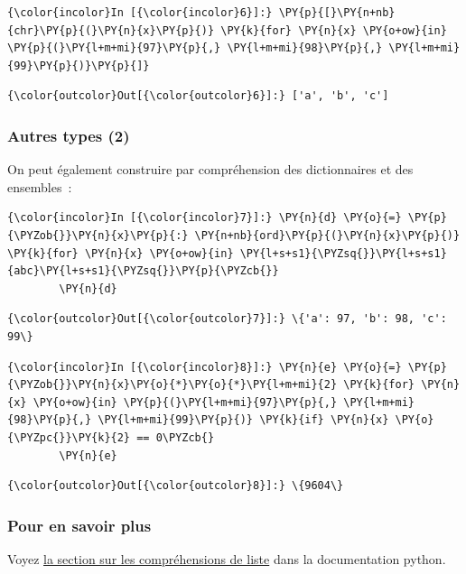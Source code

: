     \begin{Verbatim}[commandchars=\\\{\}]
{\color{incolor}In [{\color{incolor}6}]:} \PY{p}{[}\PY{n+nb}{chr}\PY{p}{(}\PY{n}{x}\PY{p}{)} \PY{k}{for} \PY{n}{x} \PY{o+ow}{in} \PY{p}{(}\PY{l+m+mi}{97}\PY{p}{,} \PY{l+m+mi}{98}\PY{p}{,} \PY{l+m+mi}{99}\PY{p}{)}\PY{p}{]}
\end{Verbatim}


\begin{Verbatim}[commandchars=\\\{\}]
{\color{outcolor}Out[{\color{outcolor}6}]:} ['a', 'b', 'c']
\end{Verbatim}
            
    \hypertarget{autres-types-2}{%
\subsubsection{Autres types (2)}\label{autres-types-2}}

    On peut également construire par compréhension des dictionnaires et des
ensembles~:

    \begin{Verbatim}[commandchars=\\\{\}]
{\color{incolor}In [{\color{incolor}7}]:} \PY{n}{d} \PY{o}{=} \PY{p}{\PYZob{}}\PY{n}{x}\PY{p}{:} \PY{n+nb}{ord}\PY{p}{(}\PY{n}{x}\PY{p}{)} \PY{k}{for} \PY{n}{x} \PY{o+ow}{in} \PY{l+s+s1}{\PYZsq{}}\PY{l+s+s1}{abc}\PY{l+s+s1}{\PYZsq{}}\PY{p}{\PYZcb{}}
        \PY{n}{d}
\end{Verbatim}


\begin{Verbatim}[commandchars=\\\{\}]
{\color{outcolor}Out[{\color{outcolor}7}]:} \{'a': 97, 'b': 98, 'c': 99\}
\end{Verbatim}
            
    \begin{Verbatim}[commandchars=\\\{\}]
{\color{incolor}In [{\color{incolor}8}]:} \PY{n}{e} \PY{o}{=} \PY{p}{\PYZob{}}\PY{n}{x}\PY{o}{*}\PY{o}{*}\PY{l+m+mi}{2} \PY{k}{for} \PY{n}{x} \PY{o+ow}{in} \PY{p}{(}\PY{l+m+mi}{97}\PY{p}{,} \PY{l+m+mi}{98}\PY{p}{,} \PY{l+m+mi}{99}\PY{p}{)} \PY{k}{if} \PY{n}{x} \PY{o}{\PYZpc{}}\PY{k}{2} == 0\PYZcb{}
        \PY{n}{e}
\end{Verbatim}


\begin{Verbatim}[commandchars=\\\{\}]
{\color{outcolor}Out[{\color{outcolor}8}]:} \{9604\}
\end{Verbatim}
            
    \hypertarget{pour-en-savoir-plus}{%
\subsubsection{Pour en savoir plus}\label{pour-en-savoir-plus}}

    Voyez
\href{https://docs.python.org/3/tutorial/datastructures.html\#list-comprehensions}{la
section sur les compréhensions de liste} dans la documentation python.